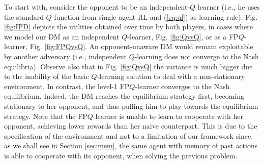 %

To start with, consider the opponent to be an independent-$Q$ learner
(i.e., he uses the standard $Q$-function from single-agent RL and (\ref{eq:ql}) as learning rule). Fig. \ref{fig:IPD} depicts the utilities obtained over time by both players, 
in cases where we model our DM as an independent $Q$-learner,
Fig. \ref{fig:QvsQ}, or as a FP$Q$-learner, Fig. \ref{fig:FPQvsQ}.
An opponent-unaware DM would remain exploitable by
another adversary (i.e., independent $Q$-learning does not converge
to the Nash equilibria).
Observe also that in Fig. \ref{fig:QvsQ} the variance is much bigger due to the inability of the basic $Q$-learning 
solution to deal with a non-stationary environment.
In contrast, the level-1 FP$Q$-learner converges to the Nash equilibrium.
Indeed, the DM reaches the equilibrium strategy first, becoming stationary to her opponent,
and thus pulling him to play towards the equilibrium strategy.
Note that the FP$Q$-learner is unable to learn to
cooperate with her opponent, achieving lower rewards than her naive
counterpart. This is due to the specification of the environment
and not to a limitation of our framework since, as we 
shall see in Section \ref{sec:mem}, the same agent with memory of past
actions is able to cooperate with its opponent, 
when solving the previous problem.
  
